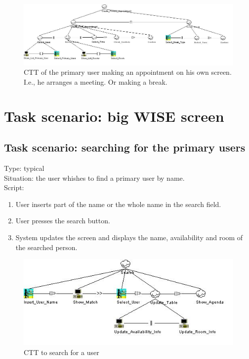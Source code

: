 \documentclass[11pt, a4paper,svglistings]{report}
\begin{document}
\begin{figure}[H]
\centering
    \includegraphics[width=1\textwidth]{CreatePrimaryAppointment.jpg}
  \caption[Primary user makes his own appointment]{\label{fig:PrimaryUserAppointment}CTT of the primary user making an appointment on his own screen. I.e., he arranges a meeting. Or making a break.}
\end{figure}

\newpage

\section{Task scenario: big WISE screen}


\subsection{Task scenario: searching for the primary users}


\label{subsec:alphabetic}Type: typical \\
Situation: the user whishes to find a primary user by name. \\
Script:
\begin{enumerate}
\item User inserts part of the name or the whole name in the search field.
\item User presses the search button.
\item System updates the screen and displays the name, availability and room of the searched 
person.
\end{enumerate}

\begin{figure}[H]
\centering
    \includegraphics[width=1\textwidth]{Search_User.jpg}
  \caption[Search a user CTT]{\label{fig:SearchUser}CTT to search for a user}
\end{figure}
\end{document}
